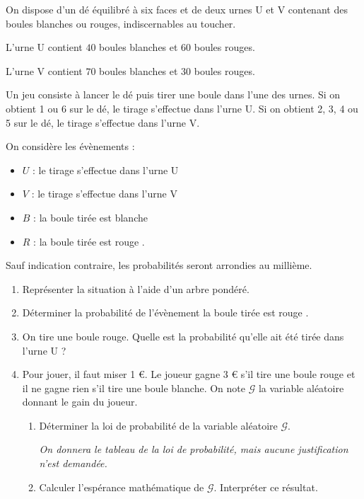 \medskip

On dispose d'un dé équilibré à six faces et de deux urnes U et V contenant des boules blanches ou rouges, indiscernables au toucher.

L'urne U contient $40$ boules blanches et $60$ boules rouges.

L'urne V contient $70$ boules blanches et $30$ boules rouges.

Un jeu consiste à lancer le dé puis tirer une boule dans l'une des urnes. Si on obtient 1 ou 6 sur le dé, le tirage s'effectue dans l'urne U. Si on obtient 2, 3, 4 ou 5 sur le dé, le tirage s'effectue dans l'urne V.

On considère les évènements :
\begin{itemize}
\item $U$ : \og le tirage s'effectue dans l'urne U \fg
\item $V$ : \og le tirage s'effectue dans l'urne V \fg
\item $B$ : \og la boule tirée est blanche \fg
\item $R$ : \og la boule tirée est rouge \fg.
\end{itemize}

Sauf indication contraire, les probabilités seront arrondies au millième.

\medskip

\begin{enumerate}
\item Représenter la situation à l'aide d'un arbre pondéré.
\item Déterminer la probabilité de l'évènement \og la boule tirée est rouge \fg.
\item On tire une boule rouge. Quelle est la probabilité qu'elle ait été tirée dans l'urne U ?
\item Pour jouer, il faut miser 1 \euro. Le joueur gagne 3 \euro{} s'il tire une boule rouge et il ne gagne rien s'il tire une boule blanche. On note $\mathcal{G}$  la variable aléatoire donnant le gain du joueur.
	\begin{enumerate}
		\item Déterminer la loi de probabilité de la variable aléatoire $\mathcal{G}$.

\emph{On donnera le tableau de la loi de probabilité, mais aucune justification n'est demandée.}
		\item Calculer l'espérance mathématique de $\mathcal{G}$. Interpréter ce résultat.
	\end{enumerate}
\end{enumerate}
